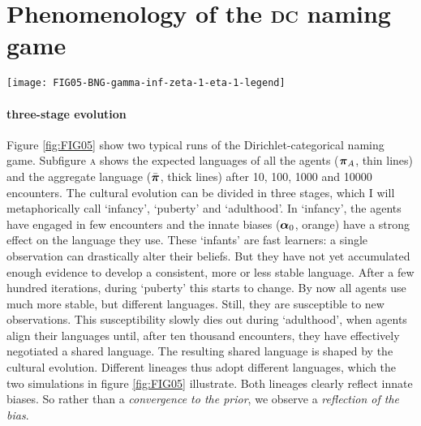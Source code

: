 \documentclass{../src/bcthesispart}
\begin{document}
\section{Phenomenology of the \textsc{dc} naming game}




\begin{SCfigure}
	\texttt{[image: FIG05-BNG-gamma-inf-zeta-1-eta-1-legend]}
	\caption{Two runs of the Bayesian Naming Game. 
	 The distributions of all agents (thin black lines) first diverge but eventually stabilise. They always reflect the prior (orange),
	 Utterances (dots) at every time plotted over a moving average of 2000 time steps. 
	 The relative frequency of all utterances reflects the language  adopted in the population.
	See main text for more details.
		\label{fig:FIG05}}
\end{SCfigure}





\paragraph{three-stage evolution}

Figure \ref{fig:FIG05} show two typical runs of the Dirichlet-categorical naming game.
Subfigure \textsc{a} shows the expected languages of all the agents ($\boldsymbol{\mathbf{\pi}}_A$, thin lines) and the aggregate language ($\bar{\boldsymbol{\mathbf{\pi}}}$, thick lines) after 10, 100, 1000 and 10000 encounters. 
The cultural evolution can be divided in three stages, which I will metaphorically call ‘infancy’, ‘puberty’ and ‘adulthood’.
In ‘infancy’, the agents have engaged in few encounters and the innate biases ($\boldsymbol{\mathbf{\alpha}}_0$, orange) have a strong effect on the language they use.
These ‘infants’ are fast learners: a single observation can drastically alter their beliefs.
But they have not yet accumulated enough evidence to develop a consistent, more or less stable language.
After a few hundred iterations, during ‘puberty’ this starts to change.
By now all agents use much more stable, but different languages. 
Still, they are susceptible to new observations.
This susceptibility slowly dies out during ‘adulthood’, when agents align their languages until, after ten thousand encounters, they have effectively negotiated a shared language.
The resulting shared language is shaped by the cultural evolution.
Different lineages thus adopt different languages, which the two simulations in figure \ref{fig:FIG05} illustrate.
Both lineages clearly reflect innate biases.
So rather than a \emph{convergence to the prior}, we observe a \emph{reflection of the bias}. 
 
\end{document}
